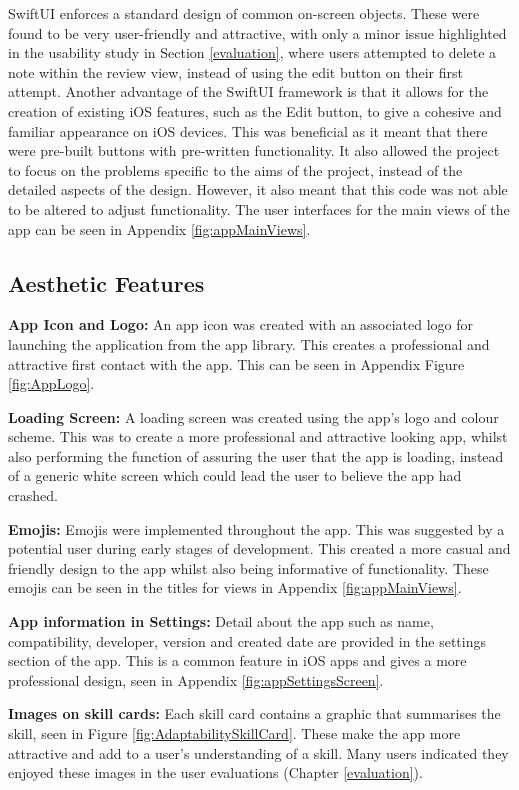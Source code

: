 \documentclass{l4proj}
\begin{document}
SwiftUI enforces a standard design of common on-screen objects. These were found to be very user-friendly and attractive, with only a minor issue highlighted in the usability study in Section \ref{evaluation}, where users attempted to delete a note within the review view, instead of using the edit button on their first attempt. Another advantage of the SwiftUI framework is that it allows for the creation of existing iOS features, such as the Edit button, to give a cohesive and familiar appearance on iOS devices. This was beneficial as it meant that there were pre-built buttons with pre-written functionality. It also allowed the project to focus on the problems specific to the aims of the project, instead of the detailed aspects of the design. However, it also meant that this code was not able to be altered to adjust functionality. The user interfaces for the main views of the app can be seen in Appendix \ref{fig:appMainViews}.

\subsection{Aesthetic Features}

\textbf{App Icon and Logo:} An app icon was created with an associated logo for launching the application from the app library. This creates a professional and attractive first contact with the app. This can be seen in Appendix Figure \ref{fig:AppLogo}.

\textbf{Loading Screen:} A loading screen was created using the app’s logo and colour scheme. This was to create a more professional and attractive looking app, whilst also performing the function of assuring the user that the app is loading, instead of a generic white screen which could lead the user to believe the app had crashed.

\textbf{Emojis:} Emojis were implemented throughout the app. This was suggested by a potential user during early stages of development. This created a more casual and friendly design to the app whilst also being informative of functionality. These emojis can be seen in the titles for views in Appendix \ref{fig:appMainViews}.

\textbf{App information in Settings:} Detail about the app such as name, compatibility, developer, version and created date are provided in the settings section of the app. This is a common feature in iOS apps and gives a more professional design, seen in Appendix \ref{fig:appSettingsScreen}.

\textbf{Images on skill cards:} Each skill card contains a graphic that summarises the skill, seen in Figure \ref{fig:AdaptabilitySkillCard}. These make the app more attractive and add to a user's understanding of a skill. Many users indicated they enjoyed these images in the user evaluations (Chapter \ref{evaluation}).
\end{document}
